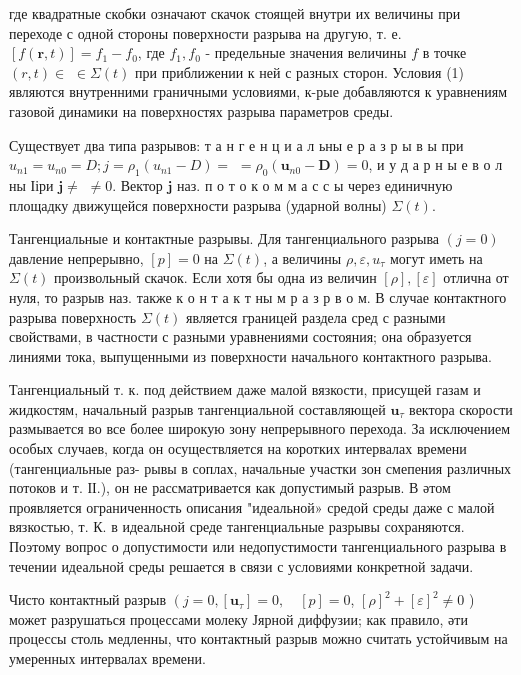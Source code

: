\documentclass[10pt]{article}
\begin{document}
где квадратные скобки означают скачок стоящей внутри их величины при переходе с одной стороны поверхности разрыва на другую, т. е. $[f(\boldsymbol{r}, t)]=f_{1}-f_{0}$, где $f_{1}, f_{0}$ - предельные значения величины $f$ в точке $(r, t) \in$ $\in \Sigma(t)$ при приближении $к$ ней с разных сторон. Условия (1) являются внутренними граничными условиями, к-рые добавляются к уравнениям газовой динамики на поверхностях разрыва параметров среды.



Существует два типа разрывов: т а н г е н ц и а л ьны е р а з р ы в ы при $u_{n 1}=u_{n 0}=D ; j=\rho_{1}\left(u_{n 1}-D\right)=$ $=\rho_{0}\left(\boldsymbol{u}_{n 0}-\boldsymbol{D}\right)=0$, и у д а р н ы е в о л ны Ііри $\boldsymbol{j} \neq$ $\neq 0$. Вектор $\boldsymbol{j}$ наз. п о т о к о м м а с с ы через единичную площадку движущейся поверхности разрыва (ударной волны) $\Sigma(t)$.



Тангенциальные и контактные разрывы. Для тангенциального разрыва $(j=0)$ давление непрерывно, $[p]=0$ на $\Sigma(t)$, а величины $\rho, \varepsilon, u_{\tau}$ могут иметь на $\Sigma(t)$ произвольный скачок. Если хотя бы одна из величин $[\rho],[\varepsilon]$ отлична от нуля, то разрыв наз. также к о н т а к т ны м р а з р в о м. В случае контактного разрыва поверхность $\Sigma(t)$ является границей раздела сред с разными свойствами, в частности с разными уравнениями состояния; она образуется линиями тока, выпущенными из поверхности начального контактного разрыва.



Тангенциальный т. к. под действием даже малой вязкости, присущей газам и жидкостям, начальный разрыв тангенциальной составляющей $\boldsymbol{u}_{\tau}$ вектора скорости размывается во все более широкую зону непрерывного перехода. За исключением особых случаев, когда он осуществляется на коротких интервалах времени (тангенциальные раз- рывы в соплах, начальные участки зон смепения различных потоков и т. ІІ.), он не рассматривается как допустимый разрыв. В әтом проявляется ограниченность описания "идеальной» средой среды даже с малой вязкостью, т. К. в идеальной среде тангенциальные разрывы сохраняются. Поэтому вопрос о допустимости или недопустимости тангенциального разрыва в течении идеальной среды решается в связи с условиями конкретной задачи.



Чисто контактный разрыв $\left(j=0,\left[\boldsymbol{u}_{\tau}\right]=0, \quad[p]=0\right.$, $[\rho]^{2}+[\varepsilon]^{2} \neq 0$ ) может разрушаться процессами молеку Јярной диффузии; как правило, әти процессы столь медленны, что контактный разрыв можно считать устойчивым на умеренных интервалах времени.
\end{document}
